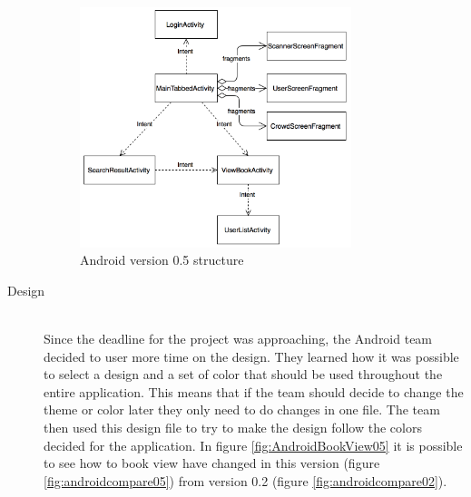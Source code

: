 \begin{description}
\begin{figure}
\centering
\includegraphics[height=7cm]{figs/v05/AndroidStructure-05.png}
\caption{Android version 0.5 structure}
\label{fig:AndroidDesign-05}
\end{figure}


    \item[Design] \hfill\\
Since the deadline for the project was approaching, the Android team decided to user more time on the design. They learned how it was possible to select a design and a set of color that should be used throughout the entire application. This means that if the team should decide to change the theme or color later they only need to do changes in one file. The team then used this design file to try to make the design follow the colors decided for the application. In figure \ref{fig:AndroidBookView05} it is possible to see how to book view have changed in this version (figure \ref{fig:androidcompare05}) from version 0.2 (figure \ref{fig:androidcompare02}).


\end{description}

